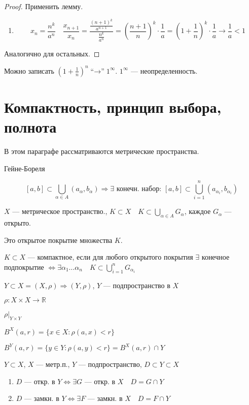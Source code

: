 \begin{proof}
    Применить лемму.
    \begin{enumerate}
        \item $$x_n=\frac{n^k}{a^n} \quad \frac{x_{n+1}}{x_n}=\frac{\frac{(n+1)^k}{a^{n+1}}}{\frac{n^k}{a^n}} = (\frac{n+1}{n})^k\cdot\frac{1}{a}=(1+\frac{1}{n})^k\cdot\frac{1}{a}\to\frac{1}{a}<1$$
    \end{enumerate}
    Аналогично для остальных.
\end{proof}

Можно записать $(1+\frac{1}{n})^n \text{``$\to$''} 1^\infty$. $1^\infty$ --- неопределенность.

\section{Компактность, принцип выбора, полнота}

В этом параграфе рассматриваются метрические пространства.

\begin{lemma}
    Гейне-Бореля

    $$[a,b]\subset \bigcup\limits_{\alpha\in A} (a_\alpha, b_\alpha) \Rightarrow \exists \text{ конечн. набор: } [a,b]\subset\bigcup\limits_{i=1}^n(a_{\alpha_i},b_{\alpha_i})$$
\end{lemma}

\begin{definition}
    $X$ --- метрическое пространство., $K\subset X \quad K\subset\bigcup\limits_{\alpha\in A} G_\alpha$, каждое $G_\alpha$ --- открыто.
    
    Это открытое покрытие множества $K$.
\end{definition}

\begin{definition}
    $K\subset X$ --- компактное, если для любого открытого покрытия $\exists$ конечное подпокрытие $\Leftrightarrow \exists \alpha_1\ldots \alpha_n \quad K\subset\bigcup\limits_{i=1}^n G_{\alpha_i}$
\end{definition}

$Y\subset X=(X,\rho) \Rightarrow (Y, \rho)$, $Y$ --- подпространство в $X$

$\rho: X\times X\to\mathbb{R}$

$\rho|_{Y\times Y}$

$B^X(a,r)=\{x\in X: \rho(a,x)<r\}$

$B^Y(a,r)=\{y\in Y:\rho(a, y)<r\} = B^X(a,r)\cap Y$

\begin{theorem}
    $Y\subset X$, $X$ --- метр.п., $Y$ --- подпространство, $D\subset Y\subset X$

    \begin{enumerate}
        \item $D$ --- откр. в $Y \Leftrightarrow \exists G$ --- откр. в $X \quad D=G\cap Y$
        \item $D$ --- замкн. в $Y \Leftrightarrow \exists F$ --- замкн. в $X \quad D=F\cap Y$
    \end{enumerate}
\end{theorem}

